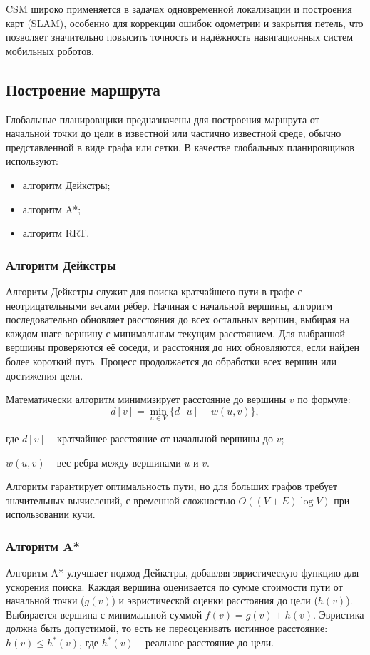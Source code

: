 {CSM широко применяется в задачах одновременной локализации и построения карт (SLAM), особенно для коррекции ошибок одометрии и закрытия петель, что позволяет значительно повысить точность и надёжность навигационных систем мобильных роботов.


\subsection{Построение маршрута}
Глобальные планировщики предназначены для построения маршрута от начальной точки
до цели в известной или частично известной среде, обычно представленной в виде
графа или сетки. В качестве глобальных планировщиков используют:
\begin{itemize}
	\item алгоритм Дейкстры;
	\item алгоритм A*;
	\item алгоритм RRT.
\end{itemize}

\subsubsection{Алгоритм Дейкстры}

Алгоритм Дейкстры служит для поиска кратчайшего пути в графе с неотрицательными
весами рёбер. Начиная с начальной вершины, алгоритм последовательно обновляет
расстояния до всех остальных вершин, выбирая на каждом шаге вершину с
минимальным текущим расстоянием. Для выбранной вершины проверяются её соседи, и
расстояния до них обновляются, если найден более короткий путь. Процесс
продолжается до обработки всех вершин или достижения цели.

Математически алгоритм минимизирует расстояние до вершины $v$ по формуле:
\begin{equation}
d[v] = \min_{u \in V} \{ d[u] + w(u, v) \},
\end{equation}

\begin{explanationx}
\item[где] $d[v]$ -- кратчайшее расстояние от начальной вершины до $v$;
\item $w(u, v)$ -- вес ребра между вершинами $u$ и $v$.
\end{explanationx}

Алгоритм гарантирует оптимальность пути,
но для больших графов требует значительных вычислений,
с временной сложностью $O((V + E) \log V)$ при использовании кучи.

\subsubsection{Алгоритм A*}
Алгоритм A* улучшает подход Дейкстры,
добавляя эвристическую функцию для ускорения поиска.
Каждая вершина оценивается по сумме стоимости пути от начальной точки ($g(v)$)
и эвристической оценки расстояния до цели ($h(v)$).
Выбирается вершина с минимальной суммой $f(v) = g(v) + h(v)$.
Эвристика должна быть допустимой, то есть не переоценивать истинное расстояние: $h(v) \leq h^*(v)$,
где $h^*(v)$ -- реальное расстояние до цели.

}
